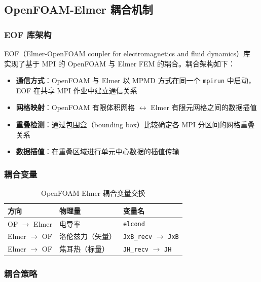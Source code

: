 \documentclass[11pt,a4paper]{article}
\begin{document}
\subsection{OpenFOAM-Elmer 耦合机制}

\subsubsection{EOF 库架构}

EOF（Elmer-OpenFOAM coupler for electromagnetics and fluid dynamics）库\cite{Vencels2019} 实现了基于 MPI 的 OpenFOAM 与 Elmer FEM 的耦合。耦合架构如下：

\begin{itemize}
    \item \textbf{通信方式}：OpenFOAM 与 Elmer 以 MPMD 方式在同一个
    \texttt{mpirun} 中启动，EOF 在共享 MPI 作业中建立通信关系
    \item \textbf{网格映射}：OpenFOAM 有限体积网格
    $\leftrightarrow$ Elmer 有限元网格之间的数据插值
    \item \textbf{重叠检测}：通过包围盒（bounding box）比较确定各 MPI 分区间的网格重叠关系
    \item \textbf{数据插值}：在重叠区域进行单元中心数据的插值传输
\end{itemize}

\subsubsection{耦合变量}

\begin{table}[H]
\centering
\caption{OpenFOAM-Elmer 耦合变量交换}
\begin{tabular}{@{}lll@{}}
\toprule
\textbf{方向} & \textbf{物理量} & \textbf{变量名} \\
\midrule
OF $\rightarrow$ Elmer & 电导率 & \texttt{elcond} \\
Elmer $\rightarrow$ OF & 洛伦兹力（矢量） & \texttt{JxB\_recv} $\rightarrow$ \texttt{JxB} \\
Elmer $\rightarrow$ OF & 焦耳热（标量） & \texttt{JH\_recv} $\rightarrow$ \texttt{JH} \\
\bottomrule
\end{tabular}
\end{table}

\subsubsection{耦合策略}
\end{document}
